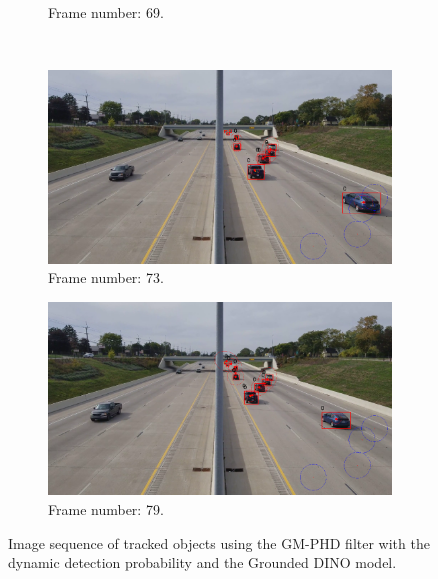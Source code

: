 \begin{figure}[H]
\begin{subfigure}{0.48\textwidth}
        \caption{Frame number: 69.}
        \label{fig:E1-V1-S3:06}
    \end{subfigure}
    \\
    \begin{subfigure}{0.48\textwidth}
        \centering
        \includegraphics[width=\linewidth]{../../../experiments/E1/V1/DINO/73}
        \caption{Frame number: 73.}
        \label{fig:E1-V1-S3:07}
    \end{subfigure}
    \begin{subfigure}{0.48\textwidth}
        \centering
        \includegraphics[width=\linewidth]{../../../experiments/E1/V1/DINO/78}
        \caption{Frame number: 79.}
        \label{fig:E1-V1-S3:08}
    \end{subfigure}
    \caption{Image sequence of tracked objects using the GM-PHD filter with the dynamic detection probability and the Grounded DINO model.}
    \label{fig:E1-V1-S3}
\end{figure}
